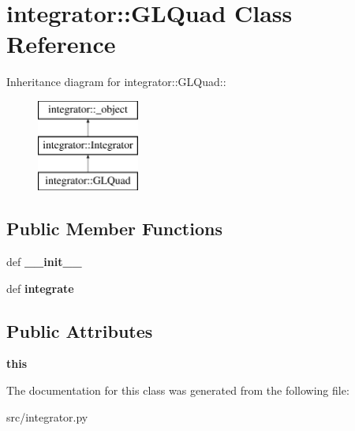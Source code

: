 \hypertarget{classintegrator_1_1GLQuad}{
\section{integrator::GLQuad Class Reference}
\label{d0/de8/classintegrator_1_1GLQuad}
}
Inheritance diagram for integrator::GLQuad::\begin{figure}[H]
\begin{center}
\leavevmode
\includegraphics[height=3cm]{d0/de8/classintegrator_1_1GLQuad}
\end{center}
\end{figure}
\subsection*{Public Member Functions}
\begin{DoxyCompactItemize}
\item 
\hypertarget{classintegrator_1_1GLQuad_af1c5b397ad095a34096db39e83602ec9}{
def {\bfseries \_\-\_\-init\_\-\_\-}}
\label{d0/de8/classintegrator_1_1GLQuad_af1c5b397ad095a34096db39e83602ec9}

\item 
\hypertarget{classintegrator_1_1GLQuad_a85a93767e974c0890fe49e3811209cb4}{
def {\bfseries integrate}}
\label{d0/de8/classintegrator_1_1GLQuad_a85a93767e974c0890fe49e3811209cb4}

\end{DoxyCompactItemize}
\subsection*{Public Attributes}
\begin{DoxyCompactItemize}
\item 
\hypertarget{classintegrator_1_1GLQuad_a613996b0a038da751fa6cf2753d921cd}{
{\bfseries this}}
\label{d0/de8/classintegrator_1_1GLQuad_a613996b0a038da751fa6cf2753d921cd}

\end{DoxyCompactItemize}


The documentation for this class was generated from the following file:\begin{DoxyCompactItemize}
\item 
src/integrator.py\end{DoxyCompactItemize}
